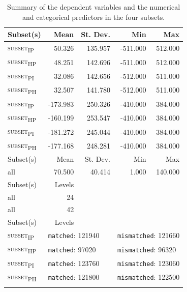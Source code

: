 \begin{table}\fontsize{10}{11}
\caption{Summary of the dependent variables and the numerical and categorical predictors in the four subsets.}
\label{tab:8.5}
\centering
\begin{tabular}{lrrrr}
\lsptoprule
Subset(s) & Mean              & St. Dev.           & Min      & Max      \\
\midrule
\textsc{subset\textsubscript{IP}}  & 50.326            & 135.957            & -511.000 & 512.000  \\
\textsc{subset\textsubscript{HP}}  & 48.251            & 142.696            & -511.000 & 512.000  \\
\textsc{subset\textsubscript{PI}}  & 32.086            & 142.656            & -512.000 & 511.000  \\
\textsc{subset\textsubscript{PH}}  & 32.507            & 141.780            & -512.000 & 511.000  \\
\textsc{subset\textsubscript{IP}}  & -173.983          & 250.326            & -410.000 & 384.000  \\
\textsc{subset\textsubscript{HP}}  & -160.199          & 253.547            & -410.000 & 384.000  \\
\textsc{subset\textsubscript{PI}}  & -181.272          & 245.044            & -410.000 & 384.000  \\
\textsc{subset\textsubscript{PH}}  & -177.168          & 248.281            & -410.000 & 384.000  \\
\midrule
Subset(s) & Mean              & St. Dev.           & Min      & Max      \\
\midrule
all       & 70.500            & 40.414             & 1.000    & 140.000  \\
\midrule
Subset(s) & \multirow{1}{*}{Levels}            & ~                  & ~        & ~        \\
\midrule
all       & \multirow{1}{*}{24}                & ~                  & ~        & ~        \\
all       & \multirow{1}{*}{42}                & ~                  & ~        & ~        \\
\midrule
Subset(s) & \multirow{1}{*}{Levels}            &                    &          &          \\
\midrule
\textsc{subset\textsubscript{IP}}  & \multicolumn{2}{l}{\texttt{matched}: 121940} & \multicolumn{2}{l}{\texttt{mismatched}: 121660}    \\

\textsc{subset\textsubscript{HP}}  & \multicolumn{2}{l}{\texttt{matched}: 97020} & \multicolumn{2}{l}{\texttt{mismatched}: 96320}    \\

\textsc{subset\textsubscript{PI}}  & \multicolumn{2}{l}{\texttt{matched}: 123760} & \multicolumn{2}{l}{\texttt{mismatched}: 123060}    \\

\textsc{subset\textsubscript{PH}}  & \multicolumn{2}{l}{\texttt{matched}: 121800} & \multicolumn{2}{l}{\texttt{mismatched}: 122500}    \\
\lspbottomrule
\end{tabular}
\end{table}

